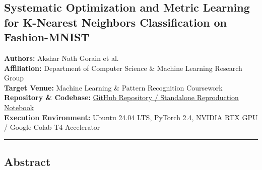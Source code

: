 \subsection*{Systematic Optimization and Metric Learning for K-Nearest
Neighbors Classification on
Fashion-MNIST}\label{systematic-optimization-and-metric-learning-for-k-nearest-neighbors-classification-on-fashion-mnist}

\href{https://colab.research.google.com/github/workforakng/fashion-mnist-knn-optimization/blob/main/fashion_knn_colab.ipynb}{}
\href{https://python.org}{}
\href{https://pytorch.org}{}
\hyperref[4-empirical-evaluation-and-benchmark-results]{}

\textbf{Authors:} Akshar Nath Gorain et al.\\
\textbf{Affiliation:} Department of Computer Science \& Machine Learning
Research Group\\
\textbf{Target Venue:} Machine Learning \& Pattern Recognition
Coursework\\
\textbf{Repository \& Codebase:} \href{fashion_knn_colab.ipynb}{GitHub
Repository / Standalone Reproduction Notebook}\\
\textbf{Execution Environment:} Ubuntu 24.04 LTS, PyTorch 2.4, NVIDIA
RTX GPU / Google Colab T4 Accelerator

\begin{center}\rule{0.5\linewidth}{0.5pt}\end{center}

\subsection{Abstract}\label{abstract}


